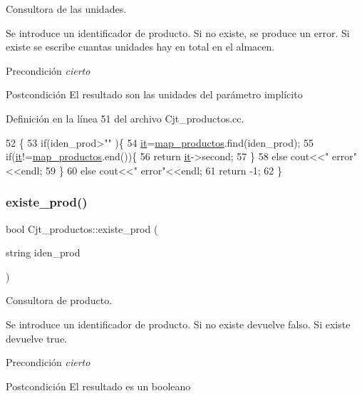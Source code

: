 Consultora de las unidades. 

Se introduce un identificador de producto. Si no existe, se produce un error. Si existe se escribe cuantas unidades hay en total en el almacen. \begin{DoxyPrecond}{Precondición}
{\itshape cierto} 
\end{DoxyPrecond}
\begin{DoxyPostcond}{Postcondición}
El resultado son las unidades del parámetro implícito 
\end{DoxyPostcond}


Definición en la línea 51 del archivo Cjt\+\_\+productos.\+cc.


\begin{DoxyCode}
52 \{
53   \textcolor{keywordflow}{if}(iden\_prod>\textcolor{stringliteral}{""} )\{
54     \hyperlink{class_cjt__productos_adedbe2194ed053eb446ec367e6d5e60e}{it}=\hyperlink{class_cjt__productos_a44e63c644fdec6cff81dcdb3cf79860c}{map\_productos}.find(iden\_prod);
55     \textcolor{keywordflow}{if}(\hyperlink{class_cjt__productos_adedbe2194ed053eb446ec367e6d5e60e}{it}!=\hyperlink{class_cjt__productos_a44e63c644fdec6cff81dcdb3cf79860c}{map\_productos}.end())\{
56       \textcolor{keywordflow}{return}  \hyperlink{class_cjt__productos_adedbe2194ed053eb446ec367e6d5e60e}{it}->second;
57     \}
58     \textcolor{keywordflow}{else} cout<<\textcolor{stringliteral}{"  error"}<<endl;
59   \}
60   \textcolor{keywordflow}{else} cout<<\textcolor{stringliteral}{"  error"}<<endl;
61   \textcolor{keywordflow}{return} -1;
62 \}
\end{DoxyCode}
\mbox{\label{class_cjt__productos_a33f8148c4da6fe03d49c993e4b477494}} 
\subsubsection{\texorpdfstring{existe\+\_\+prod()}{existe\_prod()}}
{\footnotesize\ttfamily bool Cjt\+\_\+productos\+::existe\+\_\+prod (\begin{DoxyParamCaption}\item[{string}]{iden\+\_\+prod }\end{DoxyParamCaption})}



Consultora de producto. 

Se introduce un identificador de producto. Si no existe devuelve falso. Si existe devuelve true. \begin{DoxyPrecond}{Precondición}
{\itshape cierto} 
\end{DoxyPrecond}
\begin{DoxyPostcond}{Postcondición}
El resultado es un booleano 
\end{DoxyPostcond}



